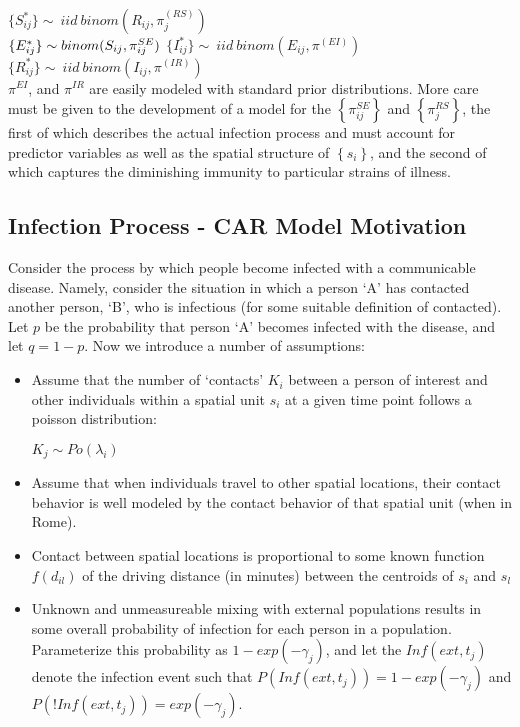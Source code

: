 \documentclass[12pt]{article}
\newcommand \noi {\noindent}
\begin{document}
    \vspace{0.15in}
        \noi
        $\{S_{ij}^*\} \sim\ iid\  binom(R_{ij}, \pi_j^{(RS)})$\\
        $\{E_{ij}^*\} \sim binom(S_{ij}, \pi^{SE}_{ij})\\$
        $\{I_{ij}^*\} \sim\ iid\  binom(E_{ij}, \pi^{(EI)})$\\
        $\{R_{ij}^*\} \sim\ iid\  binom(I_{ij}, \pi^{(IR)})$\\



$\pi^{EI}$, and $\pi^{IR}$ are easily modeled with standard prior distributions. 
More care must be given to the development of a model for the $\left\{\pi^{SE}_{ij} \right\}$ and $\left\{\pi^{RS}_j \right\}$, the first of
which describes the actual infection process and must account for predictor variables as well as the 
spatial structure of $\left\{ s_i \right\}$, and the second of which captures the diminishing immunity to particular strains of illness. 

\subsection{Infection Process - CAR Model Motivation}

Consider the process by which people become infected with a communicable disease. 
Namely, consider the situation in which a person `A' has contacted another person, `B', 
who is infectious (for some suitable definition of contacted). 
Let $p$ be the probability that person `A' becomes infected with the disease, and
let $q=1-p$. Now we introduce a number of assumptions:

\begin{itemize}

    \item Assume that the number of `contacts' $K_i$ between a person of interest 
    and other individuals within a spatial unit $s_i$ at a given time point follows a poisson 
    distribution:\\
    \begin{center}
        $K_j \sim Po(\lambda_i)$
    \end{center}
    \item Assume that when individuals travel to other spatial locations, their 
        contact behavior is well modeled by the contact behavior of that spatial unit (when in Rome).  
    \item Contact between spatial locations is proportional to some known function $f(d_{il})$
        of the driving distance (in minutes) between the centroids of $s_i$ and $s_l$
    \item Unknown and unmeasureable mixing with external populations results in some overall
        probability of infection for each person in a population. Parameterize this probability as $1-exp(-\gamma_j)$, and let 
        the $Inf(ext,t_j)$ denote the infection event such that $P(Inf(ext,t_j)) = 1-exp(-\gamma_j)$ and 
        $P(!Inf(ext,t_j)) = exp(-\gamma_j)$.
\end{itemize}
\end{document}
